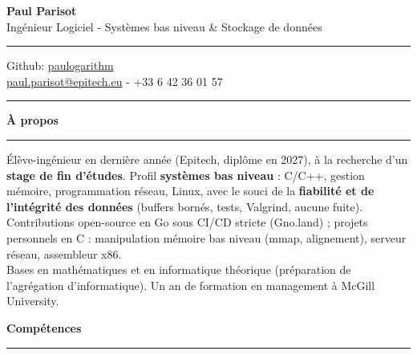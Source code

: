 \documentclass[9pt]{extarticle}
\begin{document}
\begin{center}
	{\huge\bfseries Paul Parisot}
	\\[4pt]
	{\Large Ingénieur Logiciel - Systèmes bas niveau \& Stockage de données}
	\\
\end{center}

\par\vspace{-5pt}
\rule{\linewidth}{0.4pt}
\par\vspace{-5pt}

\begin{center}
	Github: \href{https://github.com/paulogarithm}{paulogarithm}
	\\
	\href{mailto:paul.parisot@epitech.eu}{paul.parisot@epitech.eu} - +33 6 42 36 01 57
	\\
\end{center}

\par\vspace{-10pt}
\rule{\linewidth}{0.4pt}
\par\vspace{7pt}

{\large\bfseries À propos}
\par\vspace{-8pt}
\rule{\linewidth}{0.4pt}
\par\vspace{5pt}

Élève-ingénieur en dernière année (Epitech, diplôme en 2027), à la recherche d'un {\bfseries stage de fin d'études}. Profil {\bfseries systèmes bas niveau} : C/C++, gestion mémoire, programmation réseau, Linux, avec le souci de la {\bfseries fiabilité et de l'intégrité des données} (buffers bornés, tests, Valgrind, aucune fuite).
\\
Contributions open-source en Go sous CI/CD stricte (Gno.land) ; projets personnels en C : manipulation mémoire bas niveau (mmap, alignement), serveur réseau, assembleur x86.
\\
Bases en mathématiques et en informatique théorique (préparation de l'agrégation d'informatique). Un an de formation en management à McGill University.
\par\vspace{5pt}

{\large\bfseries Compétences}
\par\vspace{-8pt}
\rule{\linewidth}{0.4pt}
\par\vspace{5pt}
\end{document}
